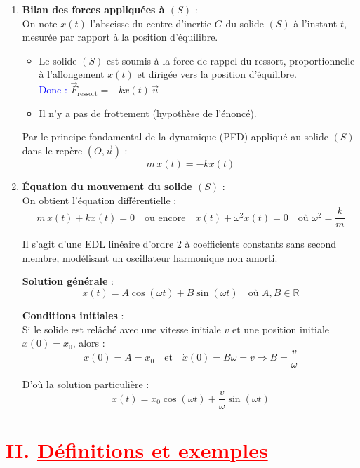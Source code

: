 \documentclass[12pt]{article}
\begin{document}
\begin{enumerate}
    \item \textbf{Bilan des forces appliquées à $(S)$} :\\
    On note $x(t)$ l'abscisse du centre d'inertie $G$ du solide $(S)$ à l'instant $t$, mesurée par rapport à la position d'équilibre.

    \begin{itemize}
        \item Le solide $(S)$ est soumis à la force de rappel du ressort, proportionnelle à l’allongement $x(t)$ et dirigée vers la position d'équilibre.\\
        \textcolor{blue}{Donc :} \quad $\vec{F}_{\text{ressort}} = -k x(t) \, \vec{u}$

        \item Il n'y a pas de frottement (hypothèse de l'énoncé).
    \end{itemize}

    Par le principe fondamental de la dynamique (PFD) appliqué au solide $(S)$ dans le repère $(O,\vec{u})$ :
    \[
    m \, \ddot{x}(t) = -k x(t)
    \]

    \item \textbf{Équation du mouvement du solide $(S)$} :\\
    On obtient l'équation différentielle :
    \[
    m \, \ddot{x}(t) + k x(t) = 0
    \quad \text{ou encore} \quad
    \ddot{x}(t) + \omega^2 x(t) = 0 \quad \text{où } \omega^2 = \dfrac{k}{m}
    \]

    Il s’agit d’une EDL linéaire d’ordre 2 à coefficients constants sans second membre, modélisant un oscillateur harmonique non amorti.

    \textbf{Solution générale} :
    \[
    x(t) = A \cos(\omega t) + B \sin(\omega t) \quad \text{où } A, B \in \mathbb{R}
    \]

    \textbf{Conditions initiales} :\\
    Si le solide est relâché avec une vitesse initiale $v$ et une position initiale $x(0) = x_0$, alors :
    \[
    x(0) = A = x_0 \quad \text{et} \quad \dot{x}(0) = B \omega = v \Rightarrow B = \dfrac{v}{\omega}
    \]

    D’où la solution particulière :
    \[
    \boxed{x(t) = x_0 \cos(\omega t) + \dfrac{v}{\omega} \sin(\omega t)}
    \]
\end{enumerate}


\section*{\textcolor{red}{II. \underline{Définitions et exemples}}}
\end{document}
